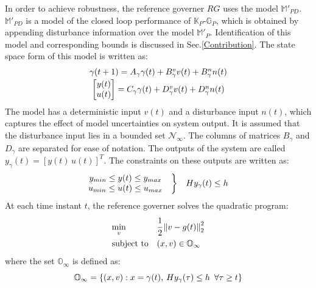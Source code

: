 \documentclass[letterpaper, 10 pt, conference]{ieeeconf}  %
\newcommand{\norm}[1]{\left\lVert#1\right\rVert}
\begin{document}
	In order to achieve robustness, the reference governer $RG$ uses the model $\mathbb{M}'_{PD}$. $\mathbb{M}'_{PD}$ is a model of the closed loop performance of $\mathbb{K}_P$-$\mathbb{G}_P$, which is obtained by appending disturbance information over the model $\mathbb{M}'_{P}$. Identification of this model and corresponding bounds is discussed in Sec.\ref{Contribution}. The state space form of this model is written as:
	\begin{equation}
	\begin{matrix}
	\gamma(t+1) = A_\gamma\gamma(t) + B^v_\gamma v(t) + B^n_\gamma n(t) \vspace{2pt}\\
	\begin{bmatrix}y(t)\\u(t)\end{bmatrix} = C_\gamma\gamma(t) + D^v_\gamma v(t) + D^n_\gamma n(t)
	\end{matrix}
	\label{M_PD}
	\end{equation}
	The model has a deterministic input $v(t)$ and a disturbance input $n(t)$, which captures the effect of model uncertainties on system output. It is assumed that the disturbance input lies in a bounded set $\mathcal{N}_{\infty}$.
	The columns of matrices $B_\gamma$ and $D_\gamma$ are separated for ease of notation. The outputs of the system are called $y_{\gamma}(t)=[y(t) \hspace{2pt} u(t)]^T$. The constraints on these outputs are written as: 
	\begin{equation*}
	\begin{matrix}
	\begin{matrix}
	y_{min} \leq y(t) \leq y_{max} \\
	u_{min} \leq u(t) \leq u_{max}
	\end{matrix} & \bigg{\}} & Hy_{\gamma}(t) \leq h
	\end{matrix}
	\end{equation*}
	At each time instant $t$, the reference governer solves the quadratic program:
	\begin{equation}
	\begin{aligned}
	& \underset{v}{\text{min}}
	& & \cfrac{1}{2}\norm{v-g(t)}_2^2 \\
	& \text{subject to}
	& & 
	(x,v) \in \mathbb{O}_{\infty}
	\end{aligned}
	\label{RGprob}
	\end{equation}
	where the set $\mathbb{O}_{\infty}$ is defined as:
	\begin{equation*}
	\mathbb{O}_{\infty} = \{(x,v): x = \gamma(t), \hspace{2pt} Hy_{\gamma}(\tau) \leq h \hspace{5pt} \forall \tau \geq t \} \\ 
	\end{equation*}
\end{document}
